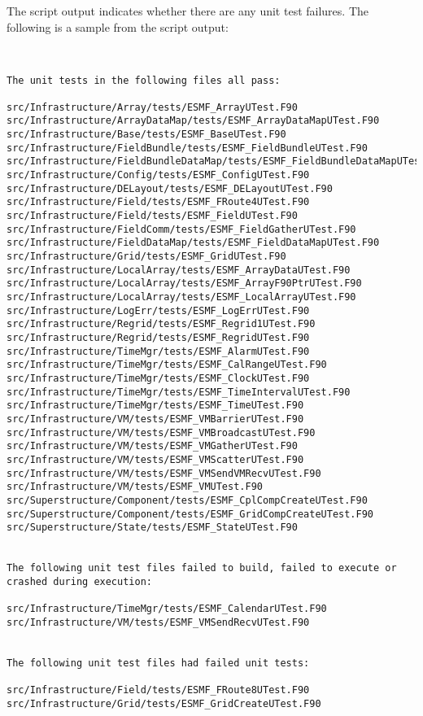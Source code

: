 The script output indicates whether there are any unit test failures.
The following is a sample from the script output:

\begin{verbatim}


The unit tests in the following files all pass:

src/Infrastructure/Array/tests/ESMF_ArrayUTest.F90
src/Infrastructure/ArrayDataMap/tests/ESMF_ArrayDataMapUTest.F90
src/Infrastructure/Base/tests/ESMF_BaseUTest.F90
src/Infrastructure/FieldBundle/tests/ESMF_FieldBundleUTest.F90
src/Infrastructure/FieldBundleDataMap/tests/ESMF_FieldBundleDataMapUTest.F90
src/Infrastructure/Config/tests/ESMF_ConfigUTest.F90
src/Infrastructure/DELayout/tests/ESMF_DELayoutUTest.F90
src/Infrastructure/Field/tests/ESMF_FRoute4UTest.F90
src/Infrastructure/Field/tests/ESMF_FieldUTest.F90
src/Infrastructure/FieldComm/tests/ESMF_FieldGatherUTest.F90
src/Infrastructure/FieldDataMap/tests/ESMF_FieldDataMapUTest.F90
src/Infrastructure/Grid/tests/ESMF_GridUTest.F90
src/Infrastructure/LocalArray/tests/ESMF_ArrayDataUTest.F90
src/Infrastructure/LocalArray/tests/ESMF_ArrayF90PtrUTest.F90
src/Infrastructure/LocalArray/tests/ESMF_LocalArrayUTest.F90
src/Infrastructure/LogErr/tests/ESMF_LogErrUTest.F90
src/Infrastructure/Regrid/tests/ESMF_Regrid1UTest.F90
src/Infrastructure/Regrid/tests/ESMF_RegridUTest.F90
src/Infrastructure/TimeMgr/tests/ESMF_AlarmUTest.F90
src/Infrastructure/TimeMgr/tests/ESMF_CalRangeUTest.F90
src/Infrastructure/TimeMgr/tests/ESMF_ClockUTest.F90
src/Infrastructure/TimeMgr/tests/ESMF_TimeIntervalUTest.F90
src/Infrastructure/TimeMgr/tests/ESMF_TimeUTest.F90
src/Infrastructure/VM/tests/ESMF_VMBarrierUTest.F90
src/Infrastructure/VM/tests/ESMF_VMBroadcastUTest.F90
src/Infrastructure/VM/tests/ESMF_VMGatherUTest.F90
src/Infrastructure/VM/tests/ESMF_VMScatterUTest.F90
src/Infrastructure/VM/tests/ESMF_VMSendVMRecvUTest.F90
src/Infrastructure/VM/tests/ESMF_VMUTest.F90
src/Superstructure/Component/tests/ESMF_CplCompCreateUTest.F90
src/Superstructure/Component/tests/ESMF_GridCompCreateUTest.F90
src/Superstructure/State/tests/ESMF_StateUTest.F90


The following unit test files failed to build, failed to execute or crashed during execution:

src/Infrastructure/TimeMgr/tests/ESMF_CalendarUTest.F90
src/Infrastructure/VM/tests/ESMF_VMSendRecvUTest.F90


The following unit test files had failed unit tests:

src/Infrastructure/Field/tests/ESMF_FRoute8UTest.F90
src/Infrastructure/Grid/tests/ESMF_GridCreateUTest.F90



\end{verbatim}
